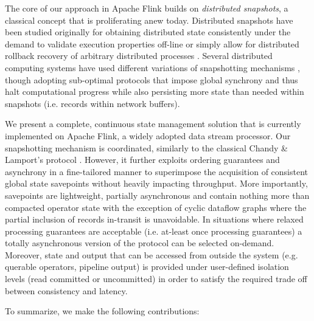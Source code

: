 
The core of our approach in Apache Flink builds on \emph{distributed snapshots}, a  classical concept that is proliferating anew today. Distributed snapshots have been studied originally for obtaining distributed state consistently under the demand to validate execution properties off-line or simply allow for distributed rollback recovery of arbitrary distributed processes \cite{elnozahy2002survey}. Several distributed computing systems have used different variations of snapshotting mechanisms \cite{murray2013naiad,low2012distributed}, though adopting sub-optimal protocols that impose global synchrony and thus halt computational progress while also persisting more state than needed within snapshots (i.e. records within network buffers).


We present a complete, continuous state management solution that is currently implemented on Apache Flink, a widely adopted data stream processor. Our snapshotting mechanism is coordinated, similarly to the classical Chandy \& Lamport's protocol \cite{chandy1985distributed}. However, it further exploits ordering guarantees and asynchrony in a fine-tailored manner to superimpose the acquisition of consistent global state savepoints without heavily impacting throughput. More importantly, savepoints are lightweight, partially asynchronous and contain nothing more than compacted operator state with the exception of cyclic dataflow graphs where the partial inclusion of records in-transit is unavoidable. In situations where relaxed processing guarantees are acceptable (i.e. at-least once processing guarantees) a totally asynchronous version of the protocol can be selected on-demand. Moreover, state and output that can be accessed from outside the system (e.g. querable operators, pipeline output) is provided under user-defined isolation levels (read committed or uncommitted) in order to satisfy the required trade off between consistency and latency.

To summarize, we make the following contributions:

